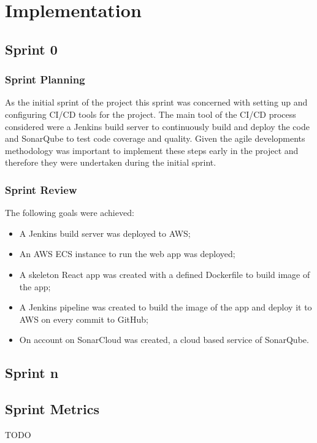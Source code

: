 \section{Implementation}
	\subsection{Sprint 0}
	\subsubsection{Sprint Planning}
	As the initial sprint of the project this sprint was concerned with setting up and configuring CI/CD tools for the project. The main tool of the CI/CD process considered were a Jenkins build server to continuously build and deploy the code and SonarQube to test code coverage and quality. Given the agile developments methodology was important to implement these steps early in the project and therefore they were undertaken during the initial sprint.

	\subsubsection{Sprint Review}
	The following goals were achieved:
	\begin{itemize}
		\item A Jenkins build server was deployed to AWS;
		\item An AWS ECS instance to run the web app was deployed;
		\item A skeleton React app was created with a defined Dockerfile to build image of the app;
		\item A Jenkins pipeline was created to build the image of the app and deploy it to AWS on every commit to GitHub;
		\item On account on SonarCloud was created, a cloud based service of SonarQube. 
	\end{itemize}

	\subsection{Sprint n}

	\subsection{Sprint Metrics}
	TODO

	